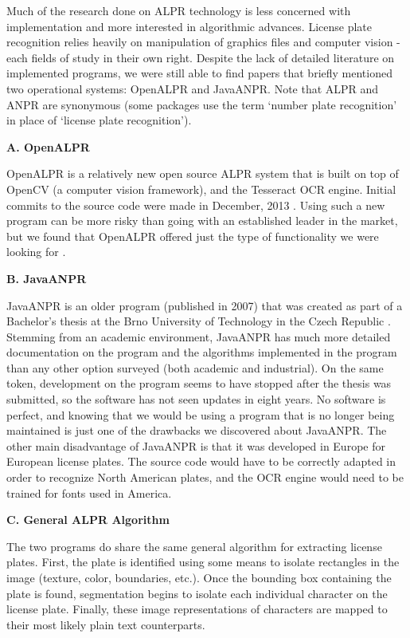 \documentclass[11pt, oneside, fullpage, doublespace]{article}
\begin{document}
Much of the research done on ALPR technology is less concerned with implementation and more interested in algorithmic advances. License plate recognition relies heavily on manipulation of graphics files and computer vision - each fields of study in their own right. Despite the lack of detailed literature on implemented programs, we were still able to find papers that briefly mentioned two operational systems: OpenALPR and JavaANPR. Note that ALPR and ANPR are synonymous (some packages use the term `number plate recognition' in place of `license plate recognition').

\textbf{A. OpenALPR}

OpenALPR is a relatively new open source ALPR system that is built on top of OpenCV (a computer vision framework), and the Tesseract OCR engine. Initial commits to the source code were made in December, 2013 \cite{trainocr}. Using such a new program can be more risky than going with an established leader in the market, but we found that OpenALPR offered just the type of functionality we were looking for \cite{openalpr}.

\textbf{B. JavaANPR}

JavaANPR is an older program (published in 2007) that was created as part of a Bachelor's thesis at the Brno University of Technology in the Czech Republic \cite{javaanpr}. Stemming from an academic environment, JavaANPR has much more detailed documentation on the program and the algorithms implemented in the program than any other option surveyed (both academic and industrial). On the same token, development on the program seems to have stopped after the thesis was submitted, so the software has not seen updates in eight years. No software is perfect, and knowing that we would be using a program that is no longer being maintained is just one of the drawbacks we discovered about JavaANPR. The other main disadvantage of JavaANPR is that it was developed in Europe for European license plates. The source code would have to be correctly adapted in order to recognize North American plates, and the OCR engine would need to be trained for fonts used in America.

\textbf{C. General ALPR Algorithm}

The two programs do share the same general algorithm for extracting license plates. First, the plate is identified using some means to isolate rectangles in the image (texture, color, boundaries, etc.). Once the bounding box containing the plate is found, segmentation begins to isolate each individual character on the license plate. Finally, these image representations of characters are mapped to their most likely plain text counterparts.
\end{document}
